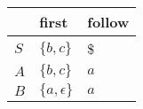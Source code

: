 \documentclass{standalone}
\providecommand\lightrule{%
	\arrayrulecolor{black!30}%
	\midrule[\lightrulewidth]%
	\arrayrulecolor{black}}
\begin{document}
\begin{tabularx}{\textwidth}{XXX}
     & first & follow\\
    \midrule
        \(S\)
        &
        \(\{b, c\}\)
        &
        \$
        \\ \lightrule
        \(A\)
        &
        \(\{b, c\}\)
        &
        \(a\)
        \\ \lightrule
        \(B\)
        &
        \(\{a, \epsilon\}\)
        &
        \(a\)
\end{tabularx}
\end{document}
